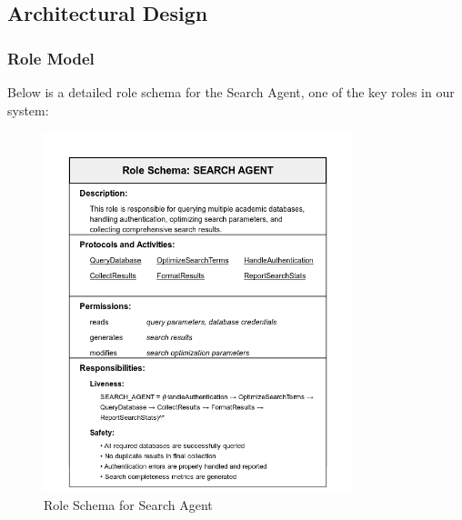 \documentclass[11pt,a4paper]{article}
\begin{document}
    
    
    

\subsection{Architectural Design}

\subsubsection{Role Model}
Below is a detailed role schema for the Search Agent, one of the key roles in our system:

\begin{figure}[H]
    \centering
    \includegraphics[width=0.8\textwidth]{images/role-model.png}
    \caption{Role Schema for Search Agent}
    \label{fig:role-model}
\end{figure}
\end{document}
